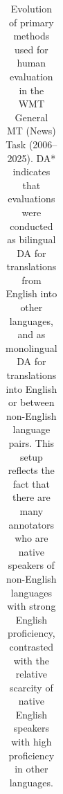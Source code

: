 \begin{table}[b]
\begin{tabular}{@{}l l p{2.8cm} p{4.5cm}@{}}
\bottomrule
\end{tabular}

\caption{Evolution of primary methods used for human evaluation in the WMT General MT (News) Task (2006--2025). DA* indicates that evaluations were conducted as bilingual DA for translations from English into other languages, and as monolingual DA for translations into English or between non-English language pairs. This setup reflects the fact that there are many annotators who are native speakers of non-English languages with strong English proficiency, contrasted with the relative scarcity of native English speakers with high proficiency in other languages.}
\label{tab:wmt-human-eval}
\end{table}

